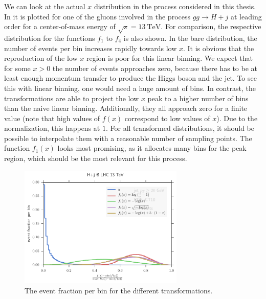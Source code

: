 We can look at the actual $x$ distribution in the process considered in this thesis.
In  it is plotted for one of the gluons involved in the process $gg \rightarrow H + j$ at leading order for a center-of-mass energy of $\sqrt{s} = \SI{13}{\tera\electronvolt}$.
For comparison, the respective distribution for the functions $f_1$ to $f_4$ is also shown.
In the bare distribution, the number of events per bin increases rapidly towards low $x$.
It is obvious that the reproduction of the low $x$ region is poor for this linear binning.
We expect that for some $x>0$ the number of events approaches zero, because there has to be at least enough momentum transfer to produce the Higgs boson and the jet.
To see this with linear binning, one would need a huge amount of bins.
In contrast, the transformations are able to project the low $x$ peak to a higher number of bins than the naive linear binning.
Additionally, they all approach zero for a finite value (note that high values of $f(x)$ correspond to low values of $x$).
Due to the normalization, this happens at $1$.
For all transformed distributions, it should be possible to interpolate them with a reasonable number of sampling points.
The function $f_1(x)$ looks most promising, as it allocates many bins for the peak region, which should be the most relevant for this process.

%
\begin{figure}[]
	\includegraphics[width=0.7\textwidth]{images/x_compare.pdf}
	\caption{The event fraction per bin for the different transformations.}
	\label{fig:x_compare}
\end{figure}
%

